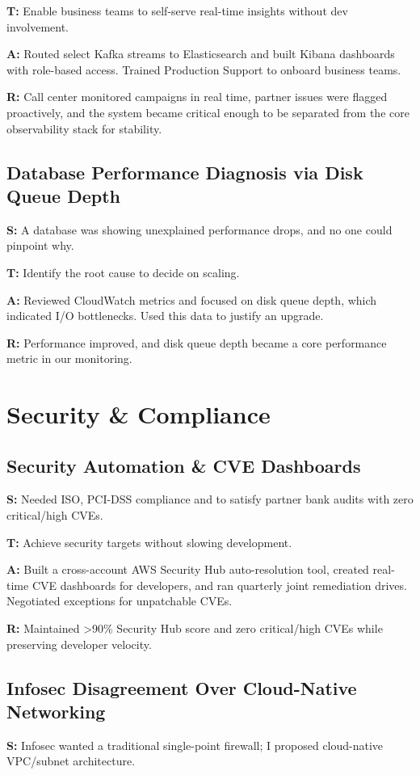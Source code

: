\documentclass[11pt]{article}
\begin{document}
\textbf{T:} Enable business teams to self-serve real-time insights without dev involvement.

\textbf{A:} Routed select Kafka streams to Elasticsearch and built Kibana dashboards with role-based access. Trained Production Support to onboard business teams.

\textbf{R:} Call center monitored campaigns in real time, partner issues were flagged proactively, and the system became critical enough to be separated from the core observability stack for stability.

\subsection{Database Performance Diagnosis via Disk Queue Depth}
\textbf{S:} A database was showing unexplained performance drops, and no one could pinpoint why.

\textbf{T:} Identify the root cause to decide on scaling.

\textbf{A:} Reviewed CloudWatch metrics and focused on disk queue depth, which indicated I/O bottlenecks. Used this data to justify an upgrade.

\textbf{R:} Performance improved, and disk queue depth became a core performance metric in our monitoring.

\section{Security \& Compliance}

\subsection{Security Automation \& CVE Dashboards}
\textbf{S:} Needed ISO, PCI-DSS compliance and to satisfy partner bank audits with zero critical/high CVEs.

\textbf{T:} Achieve security targets without slowing development.

\textbf{A:} Built a cross-account AWS Security Hub auto-resolution tool, created real-time CVE dashboards for developers, and ran quarterly joint remediation drives. Negotiated exceptions for unpatchable CVEs.

\textbf{R:} Maintained >90\% Security Hub score and zero critical/high CVEs while preserving developer velocity.

\subsection{Infosec Disagreement Over Cloud-Native Networking}
\textbf{S:} Infosec wanted a traditional single-point firewall; I proposed cloud-native VPC/subnet architecture.
\end{document}
